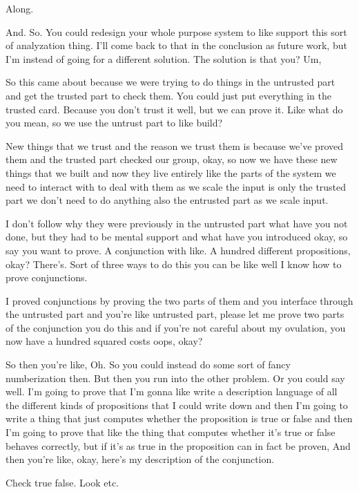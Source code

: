 \begin{subappendices}
    Along. 
    
    And. So. You could redesign your whole purpose system to like support this sort of analyzation thing. I'll come back to that in the conclusion as future work, but I'm instead of going for a different solution. The solution is that you? Um, 
    
    So this came about because we were trying to do things in the untrusted part and get the trusted part to check them. You could just put everything in the trusted card. Because you don't trust it well, but we can prove it. Like what do you mean, so we use the untrust part to like build? 
    
    New things that we trust and the reason we trust them is because we've proved them and the trusted part checked our group, okay, so now we have these new things that we built and now they live entirely like the parts of the system we need to interact with to deal with them as we scale the input is only the trusted part we don't need to do anything also the entrusted part as we scale input. 
    
    I don't follow why they were previously in the untrusted part what have you not done, but they had to be mental support and what have you introduced okay, so say you want to prove. A conjunction with like. A hundred different propositions, okay? There's. Sort of three ways to do this you can be like well I know how to prove conjunctions. 
    
    I proved conjunctions by proving the two parts of them and you interface through the untrusted part and you're like untrusted part, please let me prove two parts of the conjunction you do this and if you're not careful about my ovulation, you now have a hundred squared costs oops, okay? 
    
    So then you're like, Oh. So you could instead do some sort of fancy numberization then. But then you run into the other problem. Or you could say well. I'm going to prove that I'm gonna like write a description language of all the different kinds of propositions that I could write down and then I'm going to write a thing that just computes whether the proposition is true or false and then I'm going to prove that like the thing that computes whether it's true or false behaves correctly, but if it's as true in the proposition can in fact be proven, And then you're like, okay, here's my description of the conjunction. 
    
    Check true false. Look etc. 
    

\end{subappendices}
